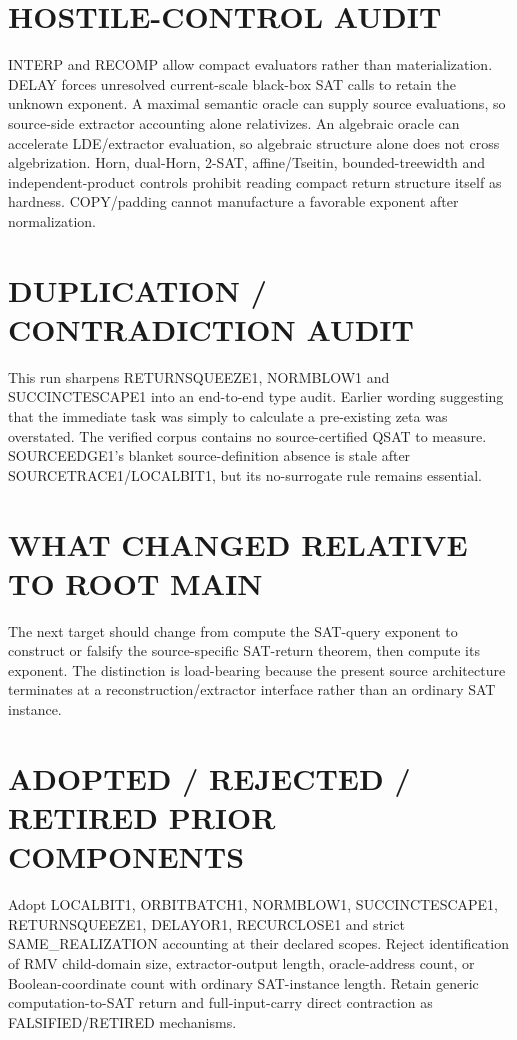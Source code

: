 \documentclass[11pt]{article}
\begin{document}
\section*{HOSTILE-CONTROL AUDIT}
INTERP and RECOMP allow compact evaluators rather than materialization. DELAY forces unresolved current-scale black-box SAT calls to retain the unknown exponent. A maximal semantic oracle can supply source evaluations, so source-side extractor accounting alone relativizes. An algebraic oracle can accelerate LDE/extractor evaluation, so algebraic structure alone does not cross algebrization. Horn, dual-Horn, 2-SAT, affine/Tseitin, bounded-treewidth and independent-product controls prohibit reading compact return structure itself as hardness. COPY/padding cannot manufacture a favorable exponent after normalization.

\section*{DUPLICATION / CONTRADICTION AUDIT}
This run sharpens RETURNSQUEEZE1, NORMBLOW1 and SUCCINCTESCAPE1 into an end-to-end type audit. Earlier wording suggesting that the immediate task was simply to calculate a pre-existing zeta was overstated. The verified corpus contains no source-certified QSAT to measure. SOURCEEDGE1's blanket source-definition absence is stale after SOURCETRACE1/LOCALBIT1, but its no-surrogate rule remains essential.

\section*{WHAT CHANGED RELATIVE TO ROOT MAIN}
The next target should change from compute the SAT-query exponent to construct or falsify the source-specific SAT-return theorem, then compute its exponent. The distinction is load-bearing because the present source architecture terminates at a reconstruction/extractor interface rather than an ordinary SAT instance.

\section*{ADOPTED / REJECTED / RETIRED PRIOR COMPONENTS}
Adopt LOCALBIT1, ORBITBATCH1, NORMBLOW1, SUCCINCTESCAPE1, RETURNSQUEEZE1, DELAYOR1, RECURCLOSE1 and strict SAME_REALIZATION accounting at their declared scopes. Reject identification of RMV child-domain size, extractor-output length, oracle-address count, or Boolean-coordinate count with ordinary SAT-instance length. Retain generic computation-to-SAT return and full-input-carry direct contraction as FALSIFIED/RETIRED mechanisms.
\end{document}
